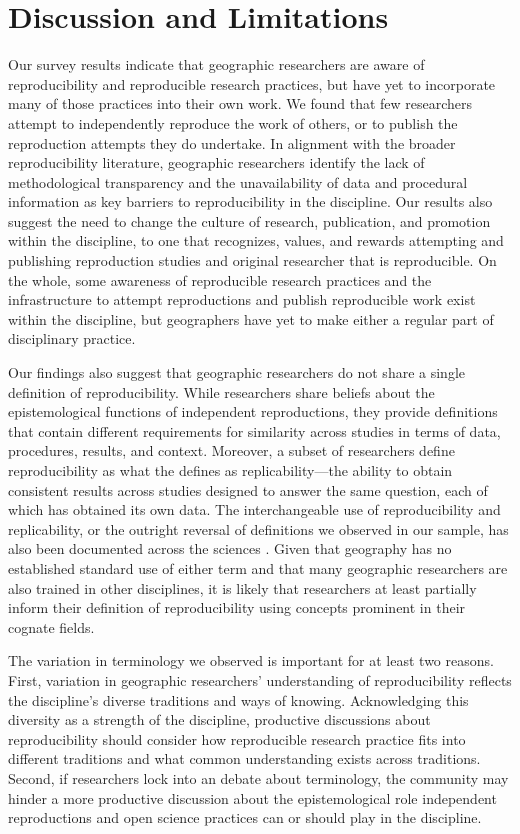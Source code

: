 \documentclass[]{interact}
\newcommand{\citep}{\parencite}
\theoremstyle{plain}%
\theoremstyle{definition}
\theoremstyle{remark}
\begin{document}
\section*{Discussion and Limitations}
Our survey results indicate that geographic researchers are aware of reproducibility and reproducible research practices, but have yet to incorporate many of those practices into their own work. 
We found that few researchers attempt to independently reproduce the work of others, or to publish the reproduction attempts they do undertake.
In alignment with the broader reproducibility literature, geographic researchers identify the lack of methodological transparency and the unavailability of data and procedural information as key barriers to reproducibility in the discipline. 
Our results also suggest the need to change the culture of research, publication, and promotion within the discipline, to one that recognizes, values, and rewards attempting and publishing reproduction studies and original researcher that is reproducible.  
On the whole, some awareness of reproducible research practices and the infrastructure to attempt reproductions and publish reproducible work exist within the discipline, but geographers have yet to make either a regular part of disciplinary practice. 

Our findings also suggest that geographic researchers do not share a single definition of reproducibility. 
While researchers share beliefs about the epistemological functions of independent reproductions, they provide definitions that contain different requirements for similarity across studies in terms of data, procedures, results, and context.  
Moreover, a subset of researchers define reproducibility as what the \textcite{NASEM2019} defines as replicability---the ability to obtain consistent results across studies designed to answer the same question, each of which has obtained its own data.
The interchangeable use of reproducibility and replicability, or the outright reversal of definitions we observed in our sample, has also been documented across the sciences \citep{barba2018terminologies, plesser2018reproducibility}. 
Given that geography has no established standard use of either term and that many geographic researchers are also trained in other disciplines, it is likely that researchers at least partially inform their definition of reproducibility using concepts prominent in their cognate fields.

The variation in terminology we observed is important for at least two reasons. 
First, variation in geographic researchers' understanding of reproducibility reflects the discipline's diverse traditions and ways of knowing. 
Acknowledging this diversity as a strength of the discipline, productive discussions about reproducibility should consider how reproducible research practice fits into different traditions and what common understanding exists across traditions. 
Second, if researchers lock into an debate about terminology, the community may hinder a more productive discussion about the epistemological role independent reproductions and open science practices can or should play in the discipline. 
\end{document}
